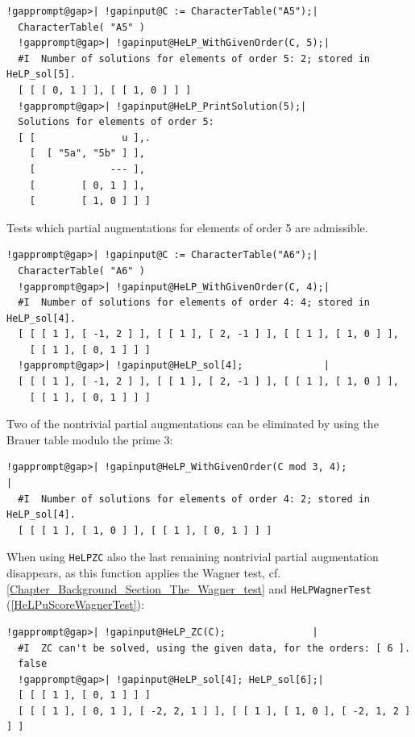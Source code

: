 \documentclass[a4paper,11pt]{report}
\begin{document}
{{ 
\begin{Verbatim}[commandchars=!@|,fontsize=\small,frame=single,label=Example]
  !gapprompt@gap>| !gapinput@C := CharacterTable("A5");|
  CharacterTable( "A5" )
  !gapprompt@gap>| !gapinput@HeLP_WithGivenOrder(C, 5);|
  #I  Number of solutions for elements of order 5: 2; stored in HeLP_sol[5].
  [ [ [ 0, 1 ] ], [ [ 1, 0 ] ] ]
  !gapprompt@gap>| !gapinput@HeLP_PrintSolution(5);|
  Solutions for elements of order 5:
  [ [               u ],.
    [  [ "5a", "5b" ] ],
    [             --- ],
    [        [ 0, 1 ] ],
    [        [ 1, 0 ] ] ]
\end{Verbatim}
 Tests which partial augmentations for elements of order 5 are admissible. 
\begin{Verbatim}[commandchars=!@|,fontsize=\small,frame=single,label=Example]
  !gapprompt@gap>| !gapinput@C := CharacterTable("A6");|
  CharacterTable( "A6" )
  !gapprompt@gap>| !gapinput@HeLP_WithGivenOrder(C, 4);|
  #I  Number of solutions for elements of order 4: 4; stored in HeLP_sol[4].
  [ [ [ 1 ], [ -1, 2 ] ], [ [ 1 ], [ 2, -1 ] ], [ [ 1 ], [ 1, 0 ] ], 
    [ [ 1 ], [ 0, 1 ] ] ]
  !gapprompt@gap>| !gapinput@HeLP_sol[4];              |
  [ [ [ 1 ], [ -1, 2 ] ], [ [ 1 ], [ 2, -1 ] ], [ [ 1 ], [ 1, 0 ] ], 
    [ [ 1 ], [ 0, 1 ] ] ]
\end{Verbatim}
 Two of the non\texttt{}trivial partial augmentations can be
eliminated by using the Brauer table modulo the prime $3$: 
\begin{Verbatim}[commandchars=!@|,fontsize=\small,frame=single,label=Example]
  !gapprompt@gap>| !gapinput@HeLP_WithGivenOrder(C mod 3, 4);                                                                    |
  #I  Number of solutions for elements of order 4: 2; stored in HeLP_sol[4].
  [ [ [ 1 ], [ 1, 0 ] ], [ [ 1 ], [ 0, 1 ] ] ]
\end{Verbatim}
 When using \texttt{HeLP{\textunderscore}ZC} also the last remaining non\texttt{}trivial partial augmentation
disappears, as this function applies the Wagner test, cf. \ref{Chapter_Background_Section_The_Wagner_test} and \texttt{HeLP{\textunderscore}WagnerTest} (\ref{HeLPuScoreWagnerTest}): 
\begin{Verbatim}[commandchars=!@|,fontsize=\small,frame=single,label=Example]
  !gapprompt@gap>| !gapinput@HeLP_ZC(C);               |
  #I  ZC can't be solved, using the given data, for the orders: [ 6 ].
  false
  !gapprompt@gap>| !gapinput@HeLP_sol[4]; HeLP_sol[6];|
  [ [ [ 1 ], [ 0, 1 ] ] ]
  [ [ [ 1 ], [ 0, 1 ], [ -2, 2, 1 ] ], [ [ 1 ], [ 1, 0 ], [ -2, 1, 2 ] ] ]

\end{Verbatim}}}
\end{document}
